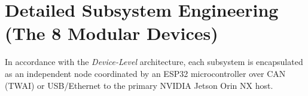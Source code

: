 \documentclass[10pt,a4paper]{article}
\begin{document}

\vspace{-0.4em}
\section{Detailed Subsystem Engineering (The 8 Modular Devices)}
\label{sec:subsystems}
\vspace{-0.2em}
In accordance with the \emph{Device-Level} architecture, each subsystem is encapsulated as an independent node coordinated by an ESP32 microcontroller over CAN (TWAI) or USB/Ethernet to the primary NVIDIA Jetson Orin NX host.
\end{document}
